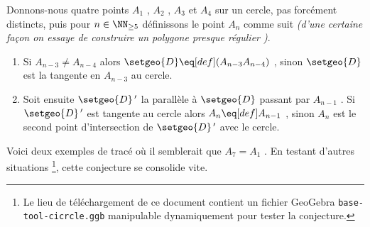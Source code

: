 Donnons-nous quatre points $A_1$ , $A_2$ , $A_3$ et $A_4$ sur un cercle, pas forcément distincts, puis pour $n \in \NN_{\geq 5}$ définissons le point $A_n$ comme suit \emph{(d'une certaine façon on essaye de construire un polygone \emph{\og presque régulier \fg})}.
\begin{enumerate}
	\item Si $A_{n-3} \neq A_{n-4}$ alors $\setgeo{D} \eq[def] (A_{n-3} A_{n-4})$ , sinon $\setgeo{D}$ est la tangente en $A_{n-3}$ au cercle.

	\item Soit ensuite $\setgeo{D}\,'$ la parallèle à $\setgeo{D}$ passant par $A_{n-1}$ . Si $\setgeo{D}\,'$ est tangente au cercle alors $A_n \eq[def] A_{n-1}$ , sinon $A_n$ est le second point d'intersection de $\setgeo{D}\,'$ avec le cercle.
\end{enumerate}


\medskip

Voici deux exemples de tracé où il semblerait que $A_7 = A_1$ . En testant d'autres situations
\footnote{
	Le lieu de téléchargement de ce document contient un fichier GeoGebra \texttt{base-tool-cicrcle.ggb} manipulable dynamiquement pour tester la conjecture.
},
cette conjecture se consolide vite.
 
